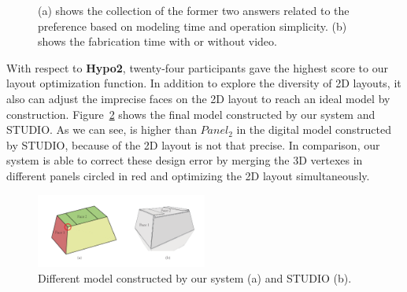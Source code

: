 \begin{figure}
	\centering
	\vspace{-1ex}
	\caption{(a) shows the collection of the former two answers related to the preference based on modeling time and operation simplicity. (b) shows the fabrication time with or without video.  }
	\label{fig:data}
\end{figure}

With respect to \textbf{Hypo2}, twenty-four participants gave the highest score to our layout optimization function. 
%
In addition to explore the diversity of 2D layouts, it also can adjust the imprecise faces on the 2D layout to reach an ideal model by construction. Figure~\ref{fig:correction} shows the final model constructed by our system and STUDIO. As we can see,  is higher than $Panel_2$ in the digital model constructed by STUDIO, because of the 2D layout is not that precise. 
%
In comparison, our system is able to correct these design error by merging the 3D vertexes in different panels circled in red and optimizing the 2D layout simultaneously.

\begin{figure}
	\centering
	\includegraphics[width=0.5\textwidth]{images/comparison}
	\caption{Different model constructed by our system (a) and STUDIO (b). }
	\label{fig:correction}
\end{figure}

